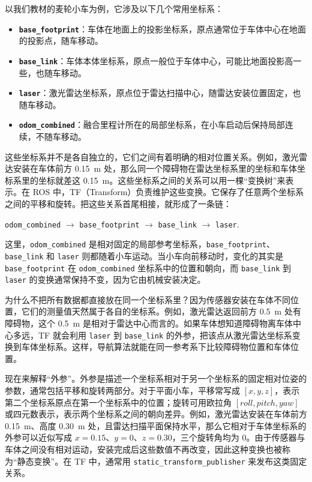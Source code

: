 \documentclass[UTF8,zihao=-4]{ctexart}
\DeclareRobustCommand{\code}[1]{\texttt{#1}}
\begin{document}
以我们教材的麦轮小车为例，它涉及以下几个常用坐标系：

\begin{itemize}
  \item \textbf{\code{base\_footprint}}：车体在地面上的投影坐标系，原点通常位于车体中心在地面的投影点，随车移动。
  \item \textbf{\code{base\_link}}：车体本体坐标系，原点一般位于车体中心，可能比地面投影高一些，也随车移动。
  \item \textbf{\code{laser}}：激光雷达坐标系，原点位于雷达扫描中心，随雷达安装位置固定，也随车移动。
  \item \textbf{\code{odom\_combined}}：融合里程计所在的局部坐标系，在小车启动后保持局部连续，不随车移动。
\end{itemize}

这些坐标系并不是各自独立的，它们之间有着明确的相对位置关系。例如，激光雷达安装在车体前方 \SI{0.15}{\metre} 处，那么同一个障碍物在雷达坐标系里的坐标和车体坐标系里的坐标就差这 \SI{0.15}{\metre}。这些坐标系之间的关系可以用一棵“变换树”来表示。在 ROS 中，TF（Transform）负责维护这些变换。它保存了任意两个坐标系之间的平移和旋转。把这些关系首尾相接，就形成了一条链：

\begin{center}
\code{odom\_combined} $\rightarrow$ \code{base\_footprint} $\rightarrow$ \code{base\_link} $\rightarrow$ \code{laser}.
\end{center}

这里，\code{odom\_combined} 是相对固定的局部参考坐标系，\code{base\_footprint}、\code{base\_link} 和 \code{laser} 则都随着小车运动。当小车向前移动时，变化的其实是 \code{base\_footprint} 在 \code{odom\_combined} 坐标系中的位置和朝向，而 \code{base\_link} 到 \code{laser} 的变换通常保持不变，因为它由机械安装决定。

为什么不把所有数据都直接放在同一个坐标系里？因为传感器安装在车体不同位置，它们的测量值天然属于各自的坐标系。例如，激光雷达返回前方 \SI{0.5}{\metre} 处有障碍物，这个 \SI{0.5}{\metre} 是相对于雷达中心而言的。如果车体想知道障碍物离车体中心多远，TF 就会利用 \code{laser} 到 \code{base\_link} 的外参，把该点从激光雷达坐标系变换到车体坐标系。这样，导航算法就能在同一参考系下比较障碍物位置和车体位置。

现在来解释“外参”。外参是描述一个坐标系相对于另一个坐标系的固定相对位姿的参数，通常包括平移和旋转两部分。对于平面小车，平移常写成 $[x,y,z]$，表示第二个坐标系原点在第一个坐标系中的位置；旋转可用欧拉角 $[roll,pitch,yaw]$ 或四元数表示，表示两个坐标系之间的朝向差异。例如，激光雷达安装在车体前方 \SI{0.15}{\metre}、高度 \SI{0.30}{\metre} 处，且雷达扫描平面保持水平，那么它相对于车体坐标系的外参可以近似写成 $x=0.15$、$y=0$、$z=0.30$，三个旋转角均为 0。由于传感器与车体之间没有相对运动，安装完成后这些数值不再改变，因此这种变换也被称为“静态变换”。在 TF 中，通常用 \code{static\_transform\_publisher} 来发布这类固定关系。
\end{document}
